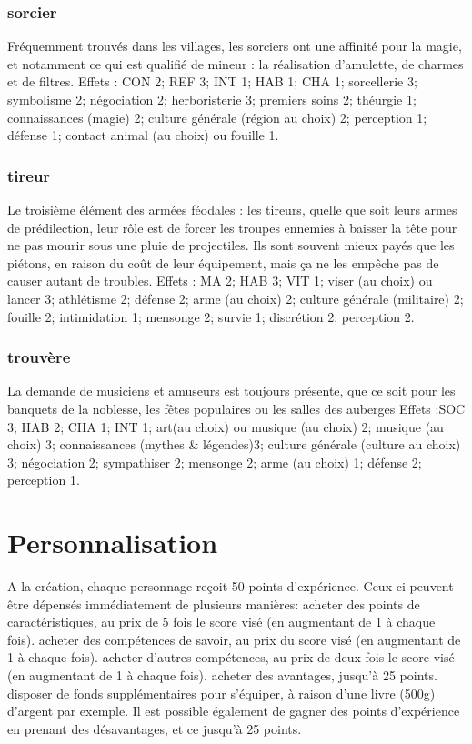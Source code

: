 \documentclass[10pt,a4paper,twocolumn]{book}
\begin{document}
\subsubsection{sorcier}
Fréquemment trouvés dans les villages, les sorciers ont une affinité pour la magie, et notamment ce qui est qualifié de mineur : la réalisation d’amulette, de charmes et de filtres.
Effets : CON 2; REF 3; INT 1; HAB 1; CHA 1; sorcellerie 3; symbolisme 2; négociation 2; herboristerie 3; premiers soins 2; théurgie 1; connaissances (magie) 2; culture générale (région au choix) 2; perception 1; défense 1; contact animal (au choix) ou fouille 1.
\subsubsection{tireur}
Le troisième élément des armées féodales : les tireurs, quelle que soit leurs armes de prédilection, leur rôle est de forcer les troupes ennemies à baisser la tête pour ne pas mourir sous une pluie de projectiles. Ils sont souvent mieux payés que les piétons, en raison du coût de leur équipement, mais ça ne les empêche pas de causer autant de troubles.
Effets : MA 2; HAB 3; VIT 1; viser (au choix) ou lancer 3; athlétisme 2; défense 2; arme (au choix) 2; culture générale (militaire) 2; fouille 2; intimidation 1; mensonge 2; survie 1; discrétion 2; perception 2.
\subsubsection{trouvère}
La demande de musiciens et amuseurs est toujours présente, que ce soit pour les banquets de la noblesse, les fêtes populaires ou les salles des auberges
Effets :SOC 3; HAB 2; CHA 1; INT 1; art(au choix) ou musique (au choix) 2; musique (au choix) 3; connaissances (mythes \& légendes)3; culture générale (culture au choix) 3; négociation 2; sympathiser 2; mensonge 2; arme (au choix) 1; défense 2; perception 1.

\section{Personnalisation}
A la création, chaque personnage reçoit 50 points d’expérience. Ceux-ci peuvent être dépensés immédiatement de plusieurs manières:
acheter des points de caractéristiques, au prix de 5 fois le score visé (en augmentant de 1 à chaque fois).
acheter des compétences de savoir, au prix du score visé (en augmentant de 1 à chaque fois).
acheter d’autres compétences, au prix de deux fois le score visé (en augmentant de 1 à chaque fois).
acheter des avantages, jusqu’à 25 points.
disposer de fonds supplémentaires pour s’équiper, à raison d’une livre (500g) d’argent par exemple.
Il est possible également de gagner des points d’expérience en prenant des désavantages, et ce jusqu’à 25 points.
\end{document}
